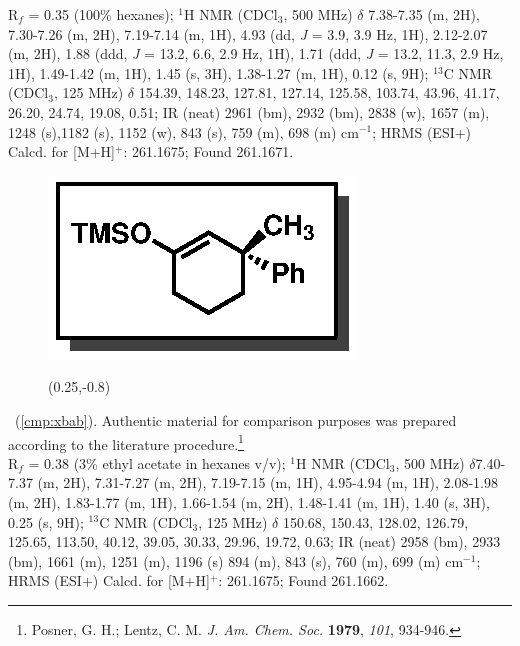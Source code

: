 R$_f$ = 0.35 (100\% hexanes); $^1$H NMR (CDCl$_3$, 500 MHz) $\delta$ 7.38-7.35 (m, 2H), 7.30-7.26
(m, 2H), 7.19-7.14 (m, 1H), 4.93 (dd, \textit{J} = 3.9, 3.9 Hz, 1H), 2.12-2.07 (m, 2H), 1.88 (ddd,
\textit{J} = 13.2, 6.6, 2.9 Hz, 1H), 1.71 (ddd, \textit{J} = 13.2, 11.3, 2.9 Hz, 1H), 1.49-1.42 (m,
1H), 1.45 (s, 3H), 1.38-1.27 (m, 1H), 0.12 (s, 9H); $^{13}$C NMR (CDCl$_3$, 125 MHz) $\delta$
154.39, 148.23, 127.81, 127.14, 125.58, 103.74, 43.96, 41.17, 26.20, 24.74, 19.08, 0.51; IR (neat)
2961 (bm), 2932 (bm), 2838 (w), 1657 (m), 1248 (s),1182 (s), 1152 (w), 843 (s), 759 (m), 698 (m)
cm$^{-1}$; HRMS (ESI+) Calcd. for  [M+H]$^+$: 261.1675; Found 261.1671.

\vspace{10pt}
\begin{figure}
  \vspace{-25pt}
  \begin{center}
    \includegraphics[scale=0.8]{chp_singlecarbon/images/xbab}
    \begin{textblock}{1}(0.25,-0.8)  \end{textblock}
  \end{center}
  \vspace{-30pt}
\end{figure}\noindent \textbf{\CMPxbab}\ (\ref{cmp:xbab}). Authentic material for comparison
purposes was prepared according to the literature procedure.\footnote{{\frenchspacing Posner, G. H.;
Lentz, C. M.	\textit{J. Am. Chem. Soc.} \textbf{1979}, \textit{101}, 934-946.}}\\
R$_f$ = 0.38 (3\% ethyl acetate in hexanes v/v); $^1$H NMR (CDCl$_3$, 500 MHz) $\delta$7.40-7.37 (m,
2H), 7.31-7.27 (m, 2H), 7.19-7.15 (m, 1H), 4.95-4.94 (m, 1H), 2.08-1.98 (m, 2H), 1.83-1.77 (m, 1H),
1.66-1.54 (m, 2H), 1.48-1.41 (m, 1H), 1.40 (s, 3H), 0.25 (s, 9H); $^{13}$C NMR (CDCl$_3$, 125 MHz)
$\delta$ 150.68, 150.43, 128.02, 126.79, 125.65, 113.50, 40.12, 39.05, 30.33, 29.96, 19.72, 0.63; IR
(neat) 2958 (bm), 2933 (bm), 1661 (m), 1251 (m), 1196 (s) 894 (m), 843 (s), 760 (m), 699 (m)
cm$^{-1}$; HRMS (ESI+) Calcd. for  [M+H]$^+$: 261.1675; Found 261.1662.

